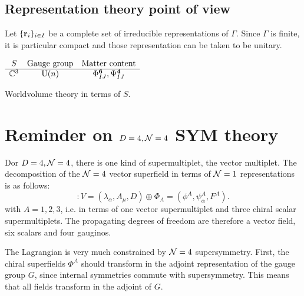 \documentclass[a4paper,11pt]{article}
\begin{document}
    \subsection{Representation theory point of view}

        Let $\{\textbf{r}_i\}_{i\in I}$ be a complete set of irreducible representations of $\Gamma$. Since $\Gamma$ is finite, it is particular compact and those representation can be taken to be unitary.


    \begin{table}[H]
        \centering
        $
        \begin{array}{ccc}
            S & \text{Gauge group} & \text{Matter content} \\ \hline
            \mathbb{C}^3 & \text{U}(n) & \Phi^{\boldsymbol{6}}_{IJ},\Psi^{\boldsymbol{4}}_{IJ}
        \end{array}
        $
        \caption{Worldvolume theory in terms of $S$.}
    \end{table}

\pagebreak
\appendix

\section{Reminder on $D=4,\mathcal{N}=4$ SYM theory}\label{sec:N4SCFT}
        
    Dor $D=4,\mathcal{N}=4$, there is one kind of supermultiplet, the vector multiplet. The decomposition of the $\mathcal{N} = 4$ vector superfield in terms of $\mathcal{N} = 1$ representations is as follows:
    \begin{equation}
        [\mN = 4 \text{ vector multiplet}] : V = (\lambda_\alpha, A_\mu, D) \oplus \Phi_A = (\phi^A,\psi^A_\alpha,F^A).
    \end{equation}
    with $A=1,2,3$, i.e. in terms of one vector supermultiplet and three chiral scalar supermultiplets. The propagating degrees of freedom are therefore a vector field, six scalars and four gauginos.
    
    The Lagrangian is very much constrained by $\mathcal{N} = 4$ supersymmetry. First, the chiral superfields $\Phi^A$ should transform in the adjoint representation of the gauge group $G$, since internal symmetries commute with supersymmetry. This means that all fields transform in the adjoint of $G$.
    
\end{document}
